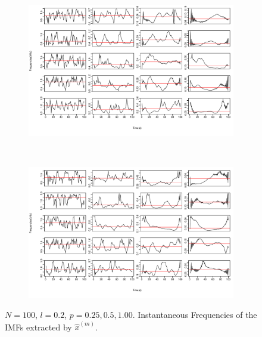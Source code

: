 \documentclass[11pt, a4paper]{article} %
\begin{document}
\begin{figure}
\begin{subfigure}{1.1\textwidth}
  \centering
  \includegraphics[width=\linewidth]{IF_N100_l02_m_1_5.pdf}
  \label{fig:sfig1}
\end{subfigure}\\
\begin{subfigure}{1.1\textwidth}
  \centering
  \includegraphics[width=\linewidth]{IF_N100_l02_m_6_10.pdf}
  \label{fig:sfig2}
\end{subfigure}
\label{fig1}
\caption{$N = 100$, $l = 0.2$, $p = 0.25, 0.5, 1.00$. Instantaneous Frequencies of the IMFs extracted by $\hat{x}^{(m)}$.}
\end{figure}

\restoregeometry


\end{document}
